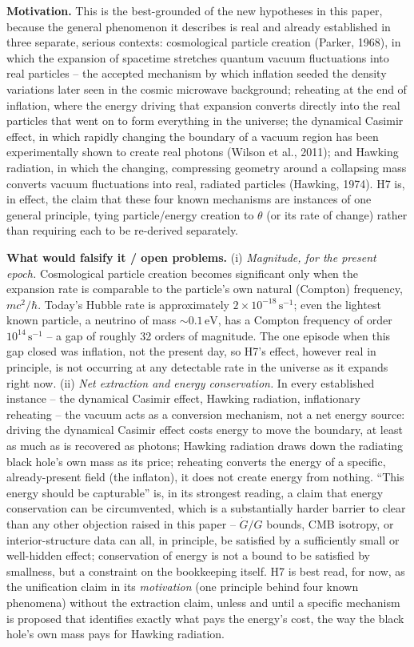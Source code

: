 \documentclass[12pt, a4paper]{article}
\begin{document}
\textbf{Motivation.} This is the best-grounded of the new hypotheses
in this paper, because the general phenomenon it describes is real
and already established in three separate, serious contexts:
cosmological particle creation (Parker, 1968), in which the
expansion of spacetime stretches quantum vacuum fluctuations into
real particles -- the accepted mechanism by which inflation seeded
the density variations later seen in the cosmic microwave background;
reheating at the end of inflation, where the energy driving that
expansion converts directly into the real particles that went on to
form everything in the universe; the dynamical Casimir effect, in
which rapidly changing the boundary of a vacuum region has been
experimentally shown to create real photons (Wilson et al., 2011);
and Hawking radiation, in which the changing, compressing geometry
around a collapsing mass converts vacuum fluctuations into real,
radiated particles (Hawking, 1974). H7 is, in effect, the claim that
these four known mechanisms are instances of one general principle,
tying particle/energy creation to $\theta$ (or its rate of change)
rather than requiring each to be re-derived separately.

\textbf{What would falsify it / open problems.}
(i) \emph{Magnitude, for the present epoch.} Cosmological particle
creation becomes significant only when the expansion rate is
comparable to the particle's own natural (Compton) frequency,
$mc^2/\hbar$. Today's Hubble rate is approximately
$2\times10^{-18}\,\mathrm{s^{-1}}$; even the lightest known particle,
a neutrino of mass $\sim0.1\,\mathrm{eV}$, has a Compton frequency of
order $10^{14}\,\mathrm{s^{-1}}$ -- a gap of roughly 32 orders of
magnitude. The one episode when this gap closed was inflation, not
the present day, so H7's effect, however real in principle, is not
occurring at any detectable rate in the universe as it expands right
now. (ii) \emph{Net extraction and energy conservation.} In every
established instance -- the dynamical Casimir effect, Hawking
radiation, inflationary reheating -- the vacuum acts as a conversion
mechanism, not a net energy source: driving the dynamical Casimir
effect costs energy to move the boundary, at least as much as is
recovered as photons; Hawking radiation draws down the radiating
black hole's own mass as its price; reheating converts the energy of
a specific, already-present field (the inflaton), it does not create
energy from nothing. ``This energy should be capturable'' is, in its
strongest reading, a claim that energy conservation can be
circumvented, which is a substantially harder barrier to clear than
any other objection raised in this paper -- $\dot G/G$ bounds, CMB
isotropy, or interior-structure data can all, in principle, be
satisfied by a sufficiently small or well-hidden effect; conservation
of energy is not a bound to be satisfied by smallness, but a
constraint on the bookkeeping itself. H7 is best read, for now, as
the unification claim in its \emph{motivation} (one principle behind
four known phenomena) without the extraction claim, unless and until
a specific mechanism is proposed that identifies exactly what pays
the energy's cost, the way the black hole's own mass pays for Hawking
radiation.
\end{document}
